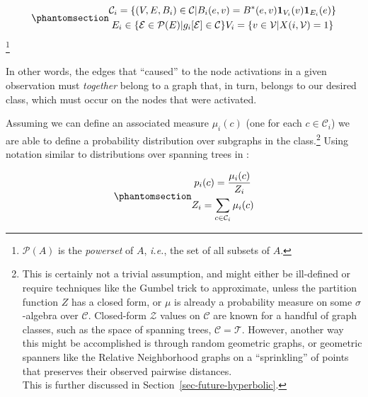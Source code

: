 \documentclass[%
	12pt,
		oneside,
		letterpaper
]{book}
\begin{document}
\begin{equation}\phantomsection\label{eq-subgraph-family}{
\begin{gathered}
\mathcal{C}_i = \{(V,E,B_i) \in\mathcal{C}|B_i(e,v)=B^*(e,v)\mathbf{1}_{V_i}(v)\mathbf{1}_{E_i}(e)\}\\
E_i\in\{\mathcal{E}\in\mathcal{P}(E)| g_i[\mathcal{E}]\in\mathcal{C}\}
V_i = \{v\in \mathcal{V} | X(i,\mathcal{V})=1\}
\end{gathered}
}\end{equation}\footnote{\(\mathcal{P}(A)\) is the \emph{powerset} of
  \(A\), \emph{i.e.}, the set of all subsets of \(A\).}

In other words, the edges that ``caused'' to the node activations in a
given observation must \emph{together} belong to a graph that, in turn,
belongs to our desired class, which must occur on the nodes that were
activated.

Assuming we can define an associated measure \(\mu_i(c)\) (one for each
\(c\in\mathcal{C}_i\)) we are able to define a probability distribution
over subgraphs in the class.\footnote{ This is certainly not a trivial
  assumption, and might either be ill-defined or require techniques like
  the Gumbel trick\autocite{GradientEstimationStochastic_Paulus2020} to
  approximate, unless the partition function \(Z\) has a closed form, or
  \(\mu\) is already a probability measure on some \(\sigma\)-algebra
  over \(\mathcal{C}\). Closed-form \(\mathcal{Z}\) values on
  \(\mathcal{C}\) are known for a handful of graph classes, such as the
  space of spanning trees, \(\mathcal{C}=\mathcal{T}\). However, another
  way this might be accomplished is through random geometric
  graphs\autocite{RandomPlaneNetworks_Gilbert1961}, or geometric
  spanners like the Relative Neighborhood
  \autocite{Relativeneighborhoodgraphs_Jaromczyk1992} graphs on a
  ``sprinkling'' of points that preserves their observed pairwise
  distances.\\
  This is further discussed in Section~\ref{sec-future-hyperbolic}.}
Using notation similar to distributions over spanning trees in
\textcite{EfficientComputationExpectations_Zmigrod2021}:

\begin{equation}\phantomsection\label{eq-subgraph-prob}{
\begin{gathered}
p_i(c) = \frac{\mu_i(c)}{Z_i}\\
Z_i = \sum_{c\in\mathcal{C}_i} \mu_i(c)
\end{gathered}
}\end{equation}
\end{document}
